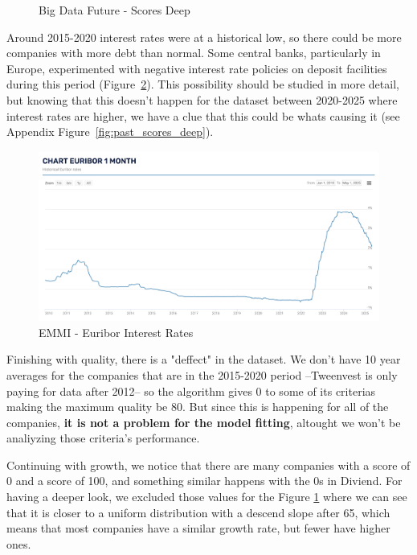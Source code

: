 \documentclass[11pt,english,a4paper,hidelinks]{book}
\begin{document}
\begin{figure}[H]
\begin{minipage}{0.48\textwidth}
        \caption{Big Data Future - Scores Deep}
        \label{fig:scores_deep}
    \end{minipage}
\end{figure}

\noindent Around 2015-2020 interest rates were at a historical low, so there could be more companies with more debt than normal. Some central banks, particularly in Europe, experimented with negative interest rate policies on deposit facilities during this period (Figure~\ref{fig:euribor}). This possibility should be studied in more detail, but knowing that this doesn't happen for the dataset between 2020-2025 where interest rates are higher, we have a clue that this could be whats causing it (see Appendix Figure~\ref{fig:past_scores_deep}).


\begin{figure}[H]
    \centering
    \includegraphics[width=1\linewidth]{images/macros/Euribor.png}
    \caption{EMMI - Euribor Interest Rates}
    \label{fig:euribor}
\end{figure}



\vspace{0.5cm}
\noindent Finishing with quality, there is a "deffect" in the dataset. We don't have 10 year averages for the companies that are in the 2015-2020 period --Tweenvest is only paying for data after 2012-- so the algorithm gives 0 to some of its criterias making the maximum quality be 80. But since this is happening for all of the companies, \textbf{it is not a problem for the model fitting}, altought we won't be analiyzing those criteria's performance.

\vspace{0.5cm}
\noindent Continuing with growth, we notice that there are many companies with a score of 0 and a score of 100, and something similar happens with the 0s in Diviend. For having a deeper look, we excluded those values for the Figure \ref{fig:scores_deep} where we can see that it is closer to a uniform distribution with a descend slope after 65, which means that most companies have a similar growth rate, but fewer have higher ones.
\end{document}

